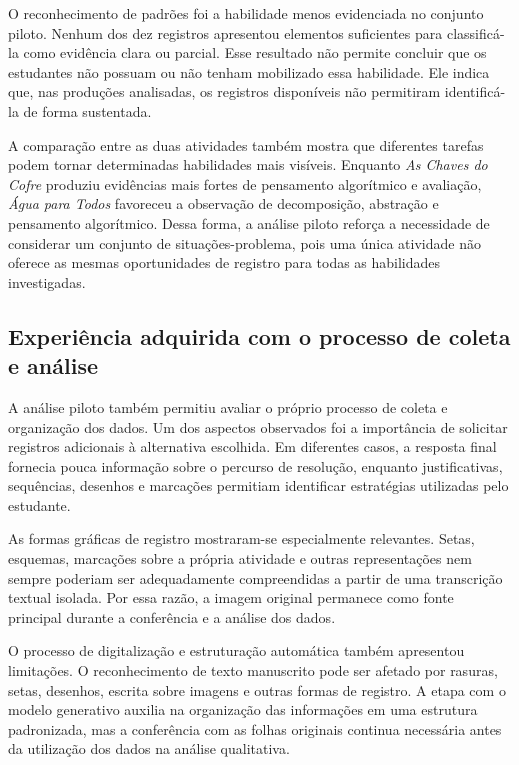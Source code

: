 O reconhecimento de padrões foi a habilidade menos evidenciada no conjunto piloto. Nenhum dos dez registros apresentou elementos suficientes para classificá-la como evidência clara ou parcial. Esse
resultado não permite concluir que os estudantes não possuam ou não tenham mobilizado essa habilidade. Ele indica que, nas produções analisadas, os registros disponíveis não permitiram identificá-la de forma sustentada.

A comparação entre as duas atividades também mostra que diferentes tarefas podem tornar determinadas habilidades mais visíveis. Enquanto \textit{As Chaves do Cofre} produziu evidências mais fortes de pensamento algorítmico e avaliação, \textit{Água para Todos} favoreceu a observação de decomposição, abstração e pensamento algorítmico. Dessa forma, a análise piloto reforça a necessidade de considerar um conjunto de situações-problema, pois uma única atividade não oferece as mesmas oportunidades de registro para todas as habilidades investigadas.

\subsection{Experiência adquirida com o processo de coleta e análise}

A análise piloto também permitiu avaliar o próprio processo de coleta e organização dos dados. Um dos aspectos observados foi a importância de solicitar registros adicionais à alternativa escolhida. Em diferentes casos, a resposta final fornecia pouca informação sobre o percurso de resolução, enquanto justificativas, sequências, desenhos e marcações permitiam identificar estratégias utilizadas pelo estudante.

As formas gráficas de registro mostraram-se especialmente relevantes. Setas, esquemas, marcações sobre a própria atividade e outras representações nem sempre poderiam ser adequadamente compreendidas a partir de uma transcrição textual isolada. Por essa razão, a imagem original permanece como fonte principal durante a conferência e a análise dos dados.

O processo de digitalização e estruturação automática também apresentou limitações. O reconhecimento de texto manuscrito pode ser afetado por rasuras, setas, desenhos, escrita sobre imagens e outras formas de registro. A etapa com o modelo generativo auxilia na organização das informações em uma estrutura padronizada, mas a conferência com as folhas originais continua necessária antes da utilização dos dados na análise qualitativa.


